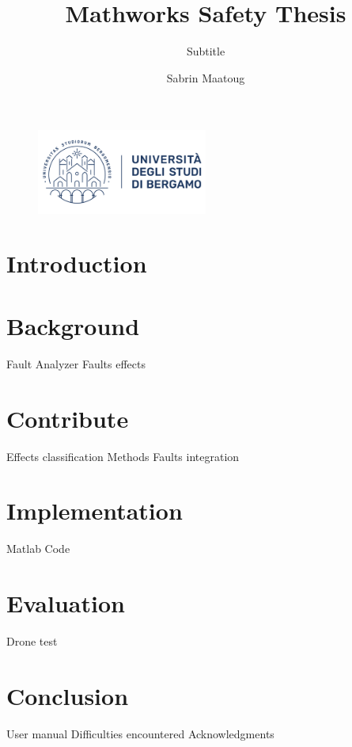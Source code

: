 \documentclass[english,master]{unibg}
\title{Mathworks Safety Thesis}
\subtitle{Subtitle}
\author{Sabrin Maatoug}
\begin{document}
\begin{figure}
    \centering
    \includegraphics[width = 0.5\textwidth]{images/unibg-logo-wide.png}
\end{figure}
\maketitle

\emptypage
\toc
\emptypage

\clearpage
{}

\chapter{Introduction}
\clearpage

\chapter{Background}
{Fault Analyzer}
\clearpage
{Faults effects}
\clearpage

\chapter{Contribute}
{Effects classification}
\clearpage
{Methods}
\clearpage
{Faults integration}
\clearpage

\chapter{Implementation}
{Matlab Code}
\clearpage

\chapter{Evaluation}
{Drone test}
\clearpage

\chapter{Conclusion}
{User manual}
\clearpage
{Difficulties encountered}
\clearpage
{Acknowledgments}
\clearpage
\end{document}
